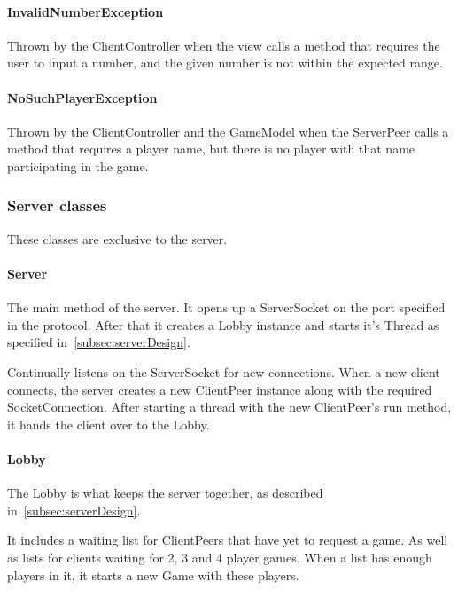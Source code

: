 \documentclass[12pt, letterpaper]{article}
\begin{document}
    \paragraph{InvalidNumberException}
    Thrown by the ClientController when the view calls a method that requires the user to input a number, and
    the given number is not within the expected range.

    \paragraph{NoSuchPlayerException}
    Thrown by the ClientController and the GameModel when the ServerPeer calls a method that requires a player name,
    but there is no player with that name participating in the game.



    \subsubsection{Server classes}

    These classes are exclusive to the server.

    \paragraph{Server}
    The main method of the server.
    It opens up a ServerSocket on the port specified in the protocol.
    After that it creates a Lobby instance and starts it's Thread as specified in~\autoref{subsec:serverDesign}.

    Continually listens on the ServerSocket for new connections.
    When a new client connects, the server creates a new ClientPeer instance along with the required SocketConnection.
    After starting a thread with the new ClientPeer's run method, it hands the client over to the Lobby.

    \paragraph{Lobby}
    The Lobby is what keeps the server together, as described in~\ref{subsec:serverDesign}.

    It includes a waiting list for ClientPeers that have yet to request a game.
    As well as lists for clients waiting for 2, 3 and 4 player games.
    When a list has enough players in it, it starts a new Game with these players.
\end{document}
